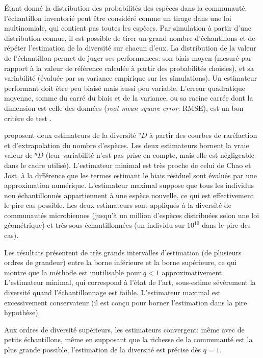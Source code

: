 \documentclass[
  11pt,
  french,
  a4paper,
  extrafontsizes,onecolumn,openright
  ]{memoir}
\begin{document}
Étant donné la distribution des probabilités des espèces dans la communauté, l'échantillon
inventorié peut être considéré comme un tirage dans une loi multinomiale, qui contient pas toutes les espèces.
Par simulation à partir d'une distribution connue, il est possible de tirer un grand nombre d'échantillons et de répéter l'estimation de la diversité sur chacun d'eux.
La distribution de la valeur de l'échantillon permet de juger ses performances: son biais moyen (mesuré par rapport à la valeur de référence calculée à partir des probabilités choisies), et sa variabilité (évaluée par sa variance empirique sur les simulations).
Un estimateur performant doit être peu biaisé mais aussi peu variable.
L'erreur quadratique moyenne, somme du carré du biais et de la variance, ou sa racine carrée dont la dimension est celle des données (\emph{root mean square error}: RMSE), est un bon critère de test \autocite[voir par exemple][figure 1]{Chao2013}.

\textcite{Haegeman2013} proposent deux estimateurs de la diversité \(^{q}\!D\) à partir des courbes de raréfaction et d'extrapolation du nombre d'espèces.
Les deux estimateurs bornent la vraie valeur de \(^{q}\!D\) (leur variabilité n'est pas prise en compte, mais elle est négligeable dans le cadre utilisé).
L'estimateur minimal est très proche de celui de Chao et Jost, à la différence que les termes estimant le biais résiduel sont évalués par une approximation numérique.
L'estimateur maximal suppose que tous les individus non échantillonnés appartiennent à une espèce nouvelle, ce qui est effectivement le pire cas possible.
Les deux estimateurs sont appliqués à la diversité de communautés microbiennes (jusqu'à un million d'espèces distribuées selon une loi géométrique) et très sous-échantillonnées (un individu sur \(10^{10}\) dans le pire des cas).

Les résultats présentent de très grands intervalles d'estimation (de plusieurs ordres de grandeur) entre la borne inférieure et la borne supérieure, ce qui montre que la méthode est inutilisable pour \(q<1\) approximativement.
L'estimateur minimal, qui correspond à l'état de l'art, sous-estime sévèrement la diversité quand l'échantillonnage est faible.
L'estimateur maximal est excessivement conservateur (il est conçu pour borner l'estimation dans la pire hypothèse).

Aux ordres de diversité supérieurs, les estimateurs convergent: même avec de petits échantillons, même en supposant que la richesse de la communauté est la plus grande possible, l'estimation de la diversité est précise dès \(q=1\).
\end{document}
